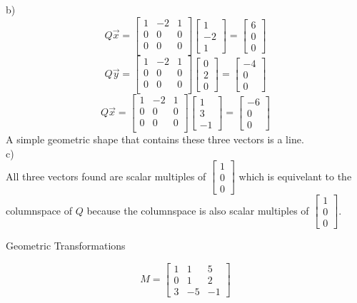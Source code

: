 \documentclass[12pt]{article}
\newcommand{\sqbrl}{\left[}
\newcommand{\sqbrr}{\right]}
\newenvironment{problem}[2][Problem]{\begin{trivlist}
\item[\hskip \labelsep {\bfseries #1}\hskip \labelsep {\bfseries #2.}]}{\end{trivlist}}
\begin{document}
b)\\
	\[Q\vec x = \sqbrl\begin{matrix}
		1 & -2 & 1\\
		0 & 0 & 0\\
		0 & 0 & 0\\
		\end{matrix}\sqbrr\sqbrl\begin{matrix}1\\-2\\1\end{matrix}\sqbrr
		= \sqbrl\begin{matrix}6\\0\\0\end{matrix}\sqbrr\]
	\[Q\vec y = \sqbrl\begin{matrix}
		1 & -2 & 1\\
		0 & 0 & 0\\
		0 & 0 & 0\\
		\end{matrix}\sqbrr\sqbrl\begin{matrix}0\\2\\0\end{matrix}\sqbrr
		= \sqbrl\begin{matrix}-4\\0\\0\end{matrix}\sqbrr\]
	\[Q\vec x = \sqbrl\begin{matrix}
		1 & -2 & 1\\
		0 & 0 & 0\\
		0 & 0 & 0\\
		\end{matrix}\sqbrr\sqbrl\begin{matrix}1\\3\\-1\end{matrix}\sqbrr
		= \sqbrl\begin{matrix}-6\\0\\0\end{matrix}\sqbrr\]
A simple geometric shape that contains these three vectors is a line.\\

c)\\
All three vectors found are scalar multiples of $\sqbrl\begin{matrix}1\\0\\0\end{matrix}\sqbrr$ which is equivelant to the columnspace of $Q$ because the columnspace is also scalar multiples of $\sqbrl\begin{matrix}1\\0\\0\end{matrix}\sqbrr$.
\begin{problem}{9}
	Geometric Transformations
\end{problem}
	\[M = \sqbrl\begin{matrix}1 & 1 & 5\\0 & 1 & 2\\3& -5 & -1\end{matrix}\sqbrr\]
	
\end{document}
